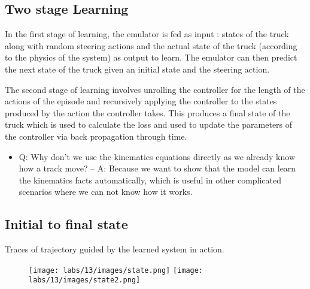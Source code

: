 \subsection{Two stage Learning}\label{sec:truck-model}
In the first stage of learning, the emulator is fed as input : states of the truck along with random steering actions and the actual state of the truck (according to the physics of the system) as output to learn. The emulator can then predict the next state of the truck given an initial state and the steering action.

The second stage of learning involves unrolling the controller for the length of the actions of the episode and recursively applying the controller to the states produced by the action the controller takes. This produces a final state of the truck which is used to calculate the loss and used to update the parameters of the controller via back propagation through time.

\begin{itemize}
\item Q: Why don't we use the kinematics equations directly as we already know how a track move? 
-- A: Because we want to show that the model can learn the kinematics facts automatically, which is useful in other complicated scenarios where we can not know how it works.
\end{itemize}

\subsection{Initial to final state}
Traces of trajectory guided by the learned system in action.
\begin{figure}[H]
    \centering
    \texttt{[image: labs/13/images/state.png]}
    \label{fig:state}
    \texttt{[image: labs/13/images/state2.png]}
    \label{fig:state2}
\end{figure}